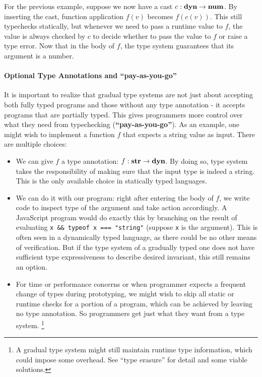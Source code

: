 For the previous example, suppose we now have a cast $c : \textbf{dyn} \rightarrow \textbf{num}$.
By inserting the cast, function application $f(v)$ becomes $f(c(v))$.
This still typechecks statically, but whenever we need to pass a runtime value to $f$,
the value is always checked by $c$ to decide whether to pass the value to $f$ or raise
a type error. Now that in the body of $f$,
the type system guarantees that its argument is a number.

\paragraph{Optional Type Annotations and ``pay-as-you-go''}

It is important to realize that gradual type systems are not just about accepting
both fully typed programs and those without any type annotation - it accepts
programs that are partially typed.
This gives programmers more control over what they need from typechecking (\textbf{``pay-as-you-go''}).
As an example, one might wish to implement a function $f$ that expects a string value
as input. There are multiple choices:

\begin{itemize}
	\item We can give $f$ a type annotation:
	$f : \textbf{str} \rightarrow \textbf{dyn}$. By doing so, type system takes the responsibility
	of making sure that the input type is indeed a string.
	This is the only available choice in statically typed languages.
	\item We can do it with our program: right after entering the body of $f$,
	we write code to inspect type of the argument and take action accordingly.
	A JavaScript program would do exactly this by branching
	on the result of evaluating \texttt{x \&\& typeof x === "string"} (suppose \texttt{x} is the argument).
	This is often seen in a dynamically typed language, as there could be no other means
	of verification. But if the type system of a gradually typed one does not have
	sufficient type expressiveness to describe desired invariant, this still remains an option.
	\item For time or performance concerns or when programmer expects a frequent change of types
	during prototyping, we might wish to skip all static or runtime checks for a portion
	of a program, which can be achieved by leaving no type annotation. So programmers
	get just what they want from a type system.
	\footnote{A gradual type system might still maintain runtime type information,
	which could impose some overhead. See ``type erasure'' for detail and some viable solutions.}
\end{itemize}

